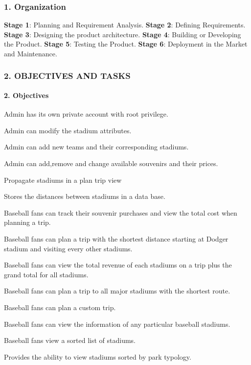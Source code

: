 \subsubsection*{1. Organization}

{\bfseries Stage 1}\+: Planning and Requirement Analysis. {\bfseries Stage 2}\+: Defining Requirements. {\bfseries Stage 3}\+: Designing the product architecture. {\bfseries Stage 4}\+: Building or Developing the Product. {\bfseries Stage 5}\+: Testing the Product. {\bfseries Stage 6}\+: Deployment in the Market and Maintenance.

\subsubsection*{2. O\+B\+J\+E\+C\+T\+I\+V\+ES A\+ND T\+A\+S\+KS}

\paragraph*{2. Objectives}


\begin{DoxyEnumerate}
\item Admin has its own private account with root privilege.
\item Admin can modify the stadium attributes.
\item Admin can add new teams and their corresponding stadiums.
\item Admin can add,remove and change available souvenirs and their prices.
\item Propagate stadiums in a plan trip view
\item Stores the distances between stadiums in a data base.
\item Baseball fans can track their souvenir purchases and view the total cost when planning a trip.
\item Baseball fans can plan a trip with the shortest distance starting at Dodger stadium and visiting every other stadiums.
\item Baseball fans can view the total revenue of each stadiums on a trip plus the grand total for all stadiums.
\item Baseball fans can plan a trip to all major stadiums with the shortest route.
\item Baseball fans can plan a custom trip.
\item Baseball fans can view the information of any particular baseball stadiums.
\item Baseball fans view a sorted list of stadiums.
\item Provides the ability to view stadiums sorted by park typology.
\end{DoxyEnumerate}

